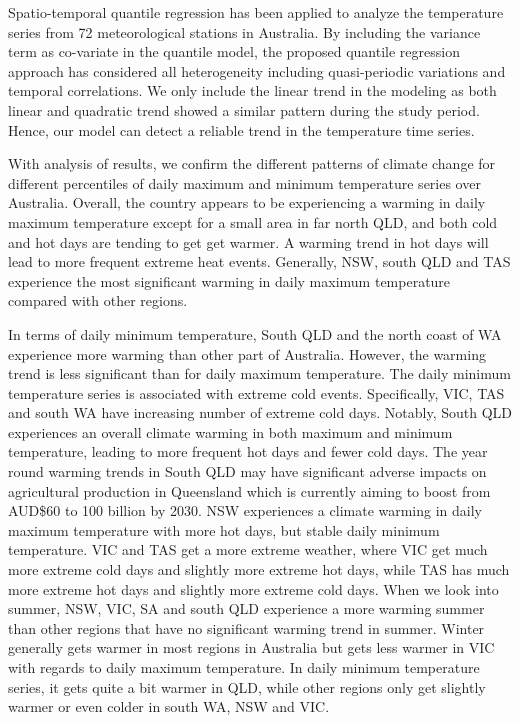 \documentclass[fleqn,10pt]{wlscirep}
\begin{document}
Spatio-temporal quantile regression has been applied to analyze the temperature series from 72 meteorological stations in Australia. By including the variance term as co-variate in the quantile model, the proposed quantile regression approach has considered all heterogeneity including quasi-periodic variations and temporal correlations. We only include the linear trend in the modeling as both linear and quadratic trend showed a similar pattern during the study period. Hence, our model can detect a reliable trend in the temperature time series.

With analysis of results, we confirm the different patterns of climate change for different percentiles of daily maximum and minimum temperature series over Australia. Overall, the country appears to be experiencing a warming in daily maximum temperature except for a small area in far north QLD, and both cold and hot days are tending to get get warmer. A warming trend in hot days will lead to more frequent extreme heat events. Generally, NSW, south QLD and TAS experience the most significant warming in daily maximum temperature compared with other regions.

In terms of daily minimum temperature,  South QLD and the north coast of WA experience more warming than other part of Australia. However, the warming trend is less significant than for daily maximum temperature. The daily minimum temperature series is associated with extreme cold events. Specifically, VIC, TAS and south WA have increasing number of extreme cold days.
Notably, South QLD experiences an overall climate warming in both maximum and minimum temperature, leading to more frequent hot days and fewer cold days.
The year round warming trends in South QLD may have significant adverse impacts on agricultural production in Queensland which is currently aiming to boost
from AUD\$60  to 100 billion by 2030.
NSW experiences a climate warming in daily maximum temperature with more hot days, but stable daily minimum temperature. VIC and TAS get a more extreme weather, where VIC get much more extreme cold days and slightly more extreme hot days, while TAS has much more extreme hot days and slightly more extreme cold days.  When we look into summer, NSW, VIC, SA and south QLD experience a more warming summer than other regions that have no significant warming trend in summer.  Winter generally gets warmer in most regions in Australia but gets less warmer in VIC with regards to daily maximum temperature. In daily minimum temperature series, it gets quite a bit warmer in QLD, while other regions only get slightly warmer or even colder in south WA, NSW and VIC.
\end{document}
